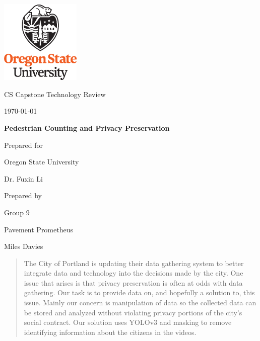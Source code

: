 \documentclass[onecolumn, draftclsnofoot,10pt, compsoc]{IEEEtran}
\def \CapstoneTeamName{		Pavement Prometheus}
\def \CapstoneTeamNumber{		9}
\def \GroupMemberOne{			Miles Davies  }
\def \CapstoneProjectName{		Pedestrian Counting and Privacy Preservation}
\def \CapstoneSponsorCompany{	Oregon State University}
\def \CapstoneSponsorPerson{		Dr. Fuxin Li}
\def \DocType{		%
				Technology Review
				}
\newcommand{\NameSigPair}[1]{\par
\makebox[2.75in][r]{#1} \hfil 	\makebox[3.25in]{\makebox[2.25in]{\hrulefill} \hfill		\makebox[.75in]{\hrulefill}}
\par\vspace{-12pt} \textit{\tiny\noindent
\makebox[2.75in]{} \hfil		\makebox[3.25in]{\makebox[2.25in][r]{Signature} \hfill	\makebox[.75in][r]{Date}}}}
\renewcommand{\NameSigPair}[1]{#1}
\begin{document}
\begin{titlepage}
    \begin{singlespace}
    	\includegraphics[height=4cm]{OSU_vertical_2C_O_over_B.eps}
        \hfill 
        \par\vspace{.2in}
        \centering
        \scshape{
            \huge CS Capstone \DocType \par
            {\large\today}\par
            \vspace{.5in}
            \textbf{\Huge\CapstoneProjectName}\par
            {\large Prepared for}\par
            \Huge \CapstoneSponsorCompany\par
            \vspace{5pt}
            {\Large\NameSigPair{\CapstoneSponsorPerson}\par}
            {\large Prepared by }\par
            Group\CapstoneTeamNumber\par
            \CapstoneTeamName\par 
            \vspace{5pt}
            {\Large
                \NameSigPair{\GroupMemberOne}\par
            }
            \vspace{20pt}
        }
        \begin{abstract}
        The City of Portland is updating their data gathering system to better integrate data and technology into the decisions made by the city. One issue that arises is that privacy preservation is often at odds with data gathering. Our task is to provide data on, and hopefully a solution to, this issue. Mainly our concern is manipulation of data so the collected data can be stored and analyzed without violating privacy portions of the city's social contract. Our solution uses YOLOv3 and masking to remove identifying information about the citizens in the videos.
        \end{abstract}    
    \end{singlespace}
\end{titlepage}
\newpage
{}
\tableofcontents
\clearpage
\end{document}
